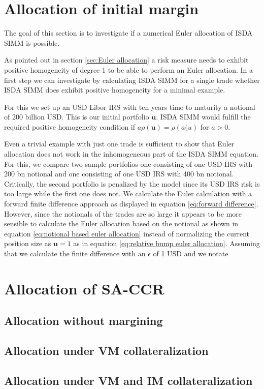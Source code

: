 \documentclass[../Thesis_AHoecherl.tex]{subfiles}
\begin{document}
    \section{Allocation of initial margin}\label{Allocation of initial margin}
    The goal of this section is to investigate if a numerical Euler allocation of \gls{ISDA SIMM} is possible.
    
    As pointed out in section \ref{sec:Euler allocation} a risk measure needs to exhibit positive homogeneity of degree 1 to be able to perform an Euler allocation.
    In a first step we can investigate by calculating ISDA SIMM for a single trade whether ISDA SIMM does exhibit positive homogeneity for a minimal example.

    For this we set up an USD Libor IRS with ten years time to maturity a notional of 200 billion USD. This is our initial portfolio $\mathbf{u}$. ISDA SIMM would fulfill the required positive homogeneity condition if $a \rho(\mathbf{u}) = \rho(a \mathbf(u)$ for $a>0$.

    Even a trivial example with just one trade is sufficient to show that Euler allocation does not work in the inhomogeneous part of the ISDA SIMM equation.
    For this, we compare two sample portfolios one consisting of one USD IRS with 200 bn notional and one consisting of one USD IRS with 400 bn notional.
    Critically, the second portfolio is penalized by the model since its USD IRS risk is too large while the first one does not. We calculate the Euler calculation with a forward finite difference approach as displayed in equation \ref{eq:forward difference}. However, since the notionals of the trades are so large it appears to be more sensible to calculate the Euler allocation based on the notional as shown in equation \ref{eq:notional based euler allocation} instead of normalizing the current position size as $\mathbf{u} = 1$ as in equation \ref{eq:relative bump euler allocation}.
    Assuming that we calculate the finite difference with an $\epsilon$ of 1 USD and we notate 

    \section{Allocation of SA-CCR}\label{Allocation of SA-CCR}
    \subsection{Allocation without margining}
    \subsection{Allocation under VM collateralization}
    \subsection{Allocation under VM and IM collateralization}
\end{document}

